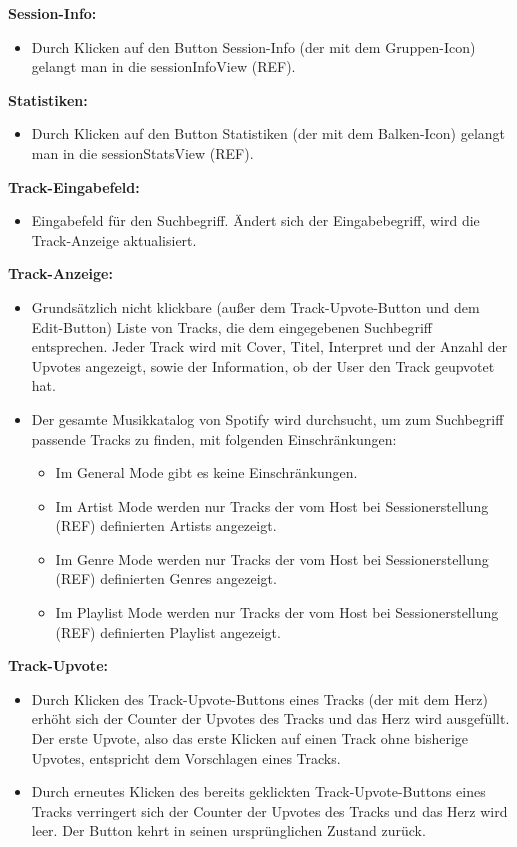 \documentclass[oneside, ngerman]{sdqtechreport}
\begin{document}
\textbf{Session-Info:}
\begin{itemize}
    \item Durch Klicken auf den Button Session-Info (der mit dem Gruppen-Icon) gelangt man in die sessionInfoView (REF).
\end{itemize}

\textbf{Statistiken:}
\begin{itemize}
    \item Durch Klicken auf den Button Statistiken (der mit dem Balken-Icon) gelangt man in die sessionStatsView (REF).
\end{itemize}

\textbf{Track-Eingabefeld:}
\begin{itemize}
    \item Eingabefeld für den Suchbegriff. Ändert sich der Eingabebegriff, wird die Track-Anzeige aktualisiert.
\end{itemize}

\textbf{Track-Anzeige:}
\begin{itemize}
    \item Grundsätzlich nicht klickbare (außer dem Track-Upvote-Button und dem Edit-Button) Liste von Tracks, die dem eingegebenen Suchbegriff entsprechen. Jeder Track wird mit Cover, Titel, Interpret und der Anzahl der Upvotes angezeigt, sowie der Information, ob der User den Track geupvotet hat.
    \item Der gesamte Musikkatalog von Spotify wird durchsucht, um zum Suchbegriff passende Tracks zu finden, mit folgenden Einschränkungen:
    \begin{itemize}
        \item Im General Mode gibt es keine Einschränkungen.
        \item Im Artist Mode werden nur Tracks der vom Host bei Sessionerstellung (REF) definierten Artists angezeigt.
        \item Im Genre Mode werden nur Tracks der vom Host bei Sessionerstellung (REF) definierten Genres angezeigt.
        \item Im Playlist Mode werden nur Tracks der vom Host bei Sessionerstellung (REF) definierten Playlist angezeigt.
    \end{itemize}
\end{itemize}

\textbf{Track-Upvote:}
\begin{itemize}
    \item Durch Klicken des Track-Upvote-Buttons eines Tracks (der mit dem Herz) erhöht sich der Counter der Upvotes des Tracks und das Herz wird ausgefüllt. Der erste Upvote, also das erste Klicken auf einen Track ohne bisherige Upvotes, entspricht dem Vorschlagen eines Tracks.
    \item Durch erneutes Klicken des bereits geklickten Track-Upvote-Buttons eines Tracks verringert sich der Counter der Upvotes des Tracks und das Herz wird leer. Der Button kehrt in seinen ursprünglichen Zustand zurück.
\end{itemize}
\end{document}
